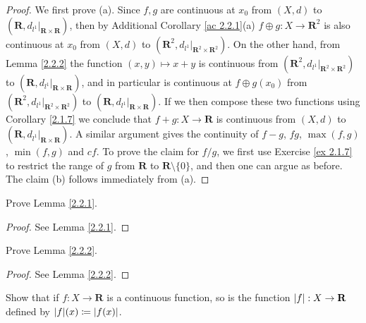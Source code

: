 \begin{proof}
    We first prove (a). Since \(f, g\) are continuous at \(x_0\) from \((X, d)\) to \((\mathbf{R}, d_{l^1}|_{\mathbf{R} \times \mathbf{R}})\), then by Additional Corollary \ref{ac 2.2.1}(a) \(f \oplus g : X \to \mathbf{R}^2\) is also continuous at \(x_0\) from \((X, d)\) to \((\mathbf{R}^2, d_{l^1}|_{\mathbf{R}^2 \times \mathbf{R}^2})\).
    On the other hand, from Lemma \ref{2.2.2} the function \((x, y) \mapsto x + y\) is continuous from \((\mathbf{R}^2, d_{l^1}|_{\mathbf{R}^2 \times \mathbf{R}^2})\) to \((\mathbf{R}, d_{l^1}|_{\mathbf{R} \times \mathbf{R}})\), and in particular is continuous at \(f \oplus g(x_0)\) from \((\mathbf{R}^2, d_{l^1}|_{\mathbf{R}^2 \times \mathbf{R}^2})\) to \((\mathbf{R}, d_{l^1}|_{\mathbf{R} \times \mathbf{R}})\).
    If we then compose these two functions using Corollary \ref{2.1.7} we conclude that \(f + g : X \to \mathbf{R}\) is continuous from \((X, d)\) to \((\mathbf{R}, d_{l^1}|_{\mathbf{R} \times \mathbf{R}})\).
    A similar argument gives the continuity of \(f - g\), \(fg\), \(\max(f, g)\), \(\min(f, g)\) and \(cf\).
    To prove the claim for \(f / g\), we first use Exercise \ref{ex 2.1.7} to restrict the range of \(g\) from \(\mathbf{R}\) to \(\mathbf{R} \setminus \{0\}\), and then one can argue as before.
    The claim (b) follows immediately from (a).
\end{proof}

\exercisesection

\begin{exercise}\label{ex 2.2.1}
    Prove Lemma \ref{2.2.1}.
\end{exercise}

\begin{proof}
    See Lemma \ref{2.2.1}.
\end{proof}

\begin{exercise}\label{ex 2.2.2}
    Prove Lemma \ref{2.2.2}.
\end{exercise}

\begin{proof}
    See Lemma \ref{2.2.2}.
\end{proof}

\begin{exercise}\label{ex 2.2.3}
    Show that if \(f : X \to \mathbf{R}\) is a continuous function, so is the function \(\abs*{f} : X \to \mathbf{R}\) defined by \(\abs*{f}(x) \coloneqq \abs*{f(x)}\).
\end{exercise}

